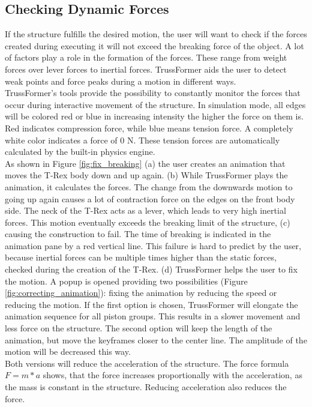 \subsection{Checking Dynamic Forces}
If the structure fulfills the desired motion, the user will want to check if the forces created during executing it will not exceed the breaking force of the object. A lot of factors play a role in the formation of the forces. These range from weight forces over lever forces to inertial forces. TrussFormer aids the user to detect weak points and force peaks during a motion in different ways.\\
TrussFormer's tools provide the possibility to constantly monitor the forces that occur during interactive movement of the structure. In simulation mode, all edges will be colored red or blue in increasing intensity the higher the force on them is. Red indicates compression force, while blue means tension force. A completely white color indicates a force of 0 N. These tension forces are automatically calculated by the built-in physics engine.\\
As shown in Figure \ref{fig:fix_breaking} (a) the user creates an animation that moves the T-Rex body down and up again. (b) While TrussFormer plays the animation, it calculates the forces. The change from the downwards motion to going up again causes a lot of contraction force on the edges on the front body side. The neck of the T-Rex acts as a lever, which leads to very high inertial forces. This motion eventually exceeds the breaking limit of the structure, (c) causing the construction to fail. The time of breaking is indicated in the animation pane by a red vertical line. This failure is hard to predict by the user, because inertial forces can be multiple times higher than the static forces, checked during the creation of the T-Rex. (d) TrussFormer helps the user to fix the motion. A popup is opened providing two possibilities (Figure \ref{fig:correcting_animation}): fixing the animation by reducing the speed or reducing the motion. If the first option is chosen, TrussFormer will elongate the animation sequence for all piston groups. This results in a slower movement and less force on the structure. The second option will keep the length of the animation, but move the keyframes closer to the center line. The amplitude of the motion will be decreased this way.\\
Both versions will reduce the acceleration of the structure. The force formula $F = m * a$ shows, that the force increases proportionally with the acceleration, as the mass is constant in the structure. Reducing acceleration also reduces the force.
